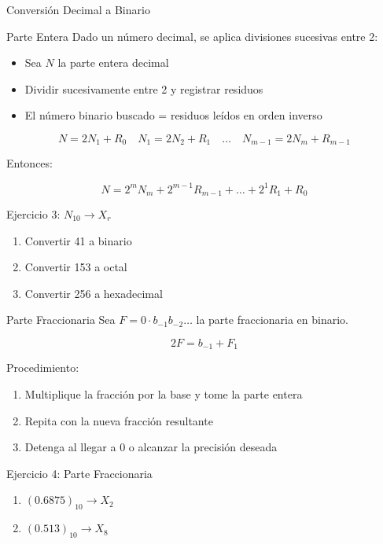 \documentclass[presentation]{beamer}
\begin{document}
\begin{frame}[label={sec:org786ab80}]{Conversión Decimal a Binario}
\begin{block}{Parte Entera}
Dado un número decimal, se aplica divisiones sucesivas entre 2:

\begin{itemize}
\item Sea \(N\) la parte entera decimal
\item Dividir sucesivamente entre 2 y registrar residuos
\item El número binario buscado = residuos leídos en \alert{orden inverso}
\end{itemize}

$$N = 2N_1 + R_0 \quad N_1 = 2N_2 + R_1 \quad \dots \quad N_{m-1} = 2N_m + R_{m-1}$$

Entonces:

$$N = 2^mN_m + 2^{m-1}R_{m-1} + \dots + 2^1R_1 + R_0$$
\end{block}

\begin{block}{Ejercicio 3: \(N_{10} \rightarrow X_r\)}
\begin{enumerate}
\item Convertir 41 a binario
\item Convertir 153 a octal
\item Convertir 256 a hexadecimal
\end{enumerate}
\end{block}

\begin{block}{Parte Fraccionaria}
Sea \(F = 0\cdot b_{-1}b_{-2}\dots\) la parte fraccionaria en binario.

$$2F = b_{-1} + F_1$$

Procedimiento:
\begin{enumerate}
\item Multiplique la fracción por la base y tome la \alert{parte entera}
\item Repita con la nueva fracción resultante
\item Detenga al llegar a 0 o alcanzar la precisión deseada
\end{enumerate}
\end{block}

\begin{block}{Ejercicio 4: Parte Fraccionaria}
\begin{enumerate}
\item \((0.6875)_{10} \rightarrow X_2\)
\item \((0.513)_{10} \rightarrow X_8\)
\end{enumerate}
\end{block}
\end{frame}
\end{document}
